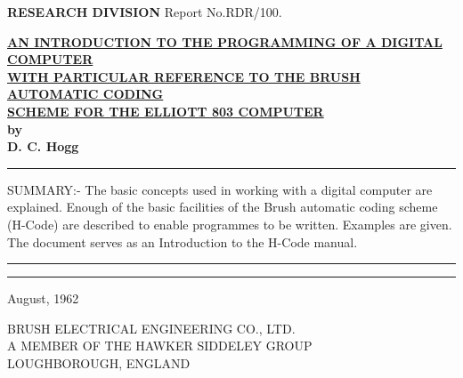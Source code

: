 \documentclass[10pt, a4paper, oneside]{article}
\newcommand{\myuline}[1]{\uline{#1}}
\begin{document}
\begin{flushleft}
\textbf{\Huge {} \Large RESEARCH DIVISION} \hfill \normalsize Report No.RDR/100.
\end{flushleft}

\vspace{3cm}

\begin{center}
\myuline{\textbf{AN INTRODUCTION TO THE PROGRAMMING OF A DIGITAL COMPUTER}} \\
\myuline{\textbf{WITH PARTICULAR REFERENCE TO THE BRUSH AUTOMATIC CODING}} \\
\myuline{\textbf{SCHEME FOR THE ELLIOTT 803 COMPUTER}} \\
\textbf{by} \\
\textbf{D. C. Hogg} \\
\end{center}

\vspace{3cm}

\par\noindent\rule{\textwidth}{0.4pt}\relax

\vspace{3cm}

\begin{center}
\parbox{0.55\textwidth}{%
SUMMARY:- The basic concepts used in working with a digital
computer are explained.  Enough of the basic facilities of
the Brush automatic coding scheme (H-Code) are described to
enable programmes to be written.  Examples are given.  The
document serves as an Introduction to the H-Code manual.}
\end{center}

\vspace{3cm}
\par\noindent\rule{\textwidth}{0.4pt}\relax\vspace{1mm}
\noindent\rule{\textwidth}{0.4pt}\relax

\vspace{1cm}

\begin{center}
August, 1962
\end{center}

\vfill

\begin{center}
\large BRUSH ELECTRICAL ENGINEERING CO., LTD. \\
\small A MEMBER OF THE HAWKER SIDDELEY GROUP \\
\large LOUGHBOROUGH, ENGLAND \\
\end{center}
\end{document}
